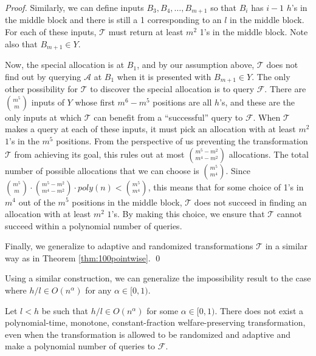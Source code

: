 \documentclass[runningheads,a4paper]{llncs}
\begin{document}
\begin{proof}
Similarly, we can define inputs $B_3,B_4,\dots,B_{m+1}$ so that $B_i$ has $i-1$ $h$'s in the middle block and there is still a 1 corresponding to an $l$ in the middle block. For each of these inputs, $\mathcal{T}$ must return at least $m^2$ 1's in the middle block. Note also that $B_{m+1}\in Y$.

Now, the special allocation is at $B_1$, and by our assumption above, $\mathcal{T}$ does not find out by querying $\mathcal{A}$ at $B_1$ when it is presented with $B_{m+1}\in Y$. The only other possibility for $\mathcal{T}$ to discover the special allocation is to query $\mathcal{F}$. There are $\binom{m^5}{m}$ inputs of $Y$ whose first $m^6-m^5$ positions are all $h$'s, and these are the only inputs at which $\mathcal{T}$ can benefit from a ``successful'' query to $\mathcal{F}$. When $\mathcal{T}$ makes a query at each of these inputs, it must pick an allocation with at least $m^2$ $1$'s in the $m^5$ positions. From the perspective of us preventing the transformation $\mathcal{T}$ from achieving its goal, this rules out at most $\binom{m^5-m^2}{m^4-m^2}$ allocations. The total number of possible allocations that we can choose is $\binom{m^5}{m^4}$. Since $\binom{m^5}{m}\cdot\binom{m^5-m^2}{m^4-m^2}\cdot poly(n)<\binom{m^5}{m^4}$, this means that for some choice of 1's in $m^4$ out of the $m^5$ positions in the middle block, $\mathcal{T}$ does not succeed in finding an allocation with at least $m^2$ $1$'s. By making this choice, we ensure that $\mathcal{T}$ cannot succeed within a polynomial number of queries.

Finally, we generalize to adaptive and randomized transformations $\mathcal{T}$ in a similar way as in Theorem \ref{thm:100pointwise}. \qed
\end{proof}

Using a similar construction, we can generalize the impossibility result to the case where $h/l\in O(n^\alpha)$ for any $\alpha\in [0,1)$.

\begin{theorem}
\label{thm:nonconstratioconstpointwise}
Let $l<h$ be such that $h/l\in O(n^\alpha)$ for some $\alpha\in [0,1)$. There does not exist a polynomial-time, monotone, constant-fraction welfare-preserving transformation, even when the transformation is allowed to be randomized and adaptive and make a polynomial number of queries to $\mathcal{F}$.
\end{theorem}
\end{document}
